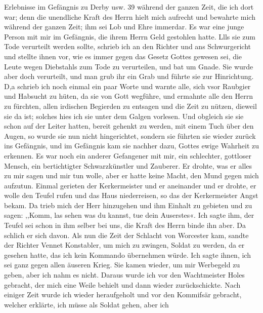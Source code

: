 Erlebnisse im Gefängnis zu Derby usw. 39
während der ganzen Zeit, die ich dort war; denn die unendliche
Kraft des Herrn hielt mich aufrecht und bewahrte mich während
der ganzen Zeit; ihm sei Lob und Ehre immerdar.
Es war eine junge Person mit mir im Gefängnis, die ihrem
Herrn Geld gestohlen hatte. Llls sie zum Tode verurteilt werden
sollte, schrieb ich an den Richter und ans Schwurgericht und
stellte ihnen vor, wie es immer gegen das Gesetz Gottes gewesen
sei, die Leute wegen Diebstahls zum Tode zu verurteilen, und
bat um Gnade. Sie wurde aber doch verurteilt, und man grub
ihr ein Grab und führte sie zur Hinrichtung. D,a schrieb ich noch
einmal ein paar Worte und warnte alle, sich vsor Raubgier und
Habsucht zu hüten, da sie von Gott wegführe, und ermahnte alle
den Herrn zu fürchten, allen irdischen Begierden zu entsagen und
die Zeit zu nützen, dieweil sie da ist; solches hies ich sie unter
dem Galgen vorlesen. Und obgleich sie sie schon auf der Leiter
hatten, bereit gehenkt zu werden, mit einem Tuch über den Augen,
so wurde sie nun nicht hingerichtet, sondern sie führten sie wieder
zurück ins Gefängnis, und im Gefängnis kam sie nachher dazu,
Gottes ewige Wahrheit zu erkennen.
Es war noch ein anderer Gefangener mit mir, ein schlechter,
gottloser Mensch, ein bertichtigter Schwarzkünstler und Zauberer.
Er drohte, was er alles zu mir sagen und mir tun wolle, aber
er hatte keine Macht, den Mund gegen mich aufzutun. Einmal
gerieten der Kerkermeister und er aneinander und er drohte, er
wolle den Teufel rufen und das Haus niederreisen, so das der
Kerkermeister Angst bekam. Da trieb mich der Herr hinzugehen
und ihm Einhalt zu gebieten und zu sagen: ,,Komm, las sehen
was du kannst, tue dein Auserstes«. Ich sagte ihm, der Teufel
sei schon in ihm selber bei uns, die Kraft des Herrn binde ihn
aber. Da schlich er sich davon.
Als nun die Zeit der Schlacht von Worcester kam, sandte
der Richter Vennet Konstabler, um mich zu zwingen, Soldat zu
werden, da er gesehen hatte, das ich kein Kommando übernehmen
würde. Ich sagte ihnen, ich sei ganz gegen allen äuseren Krieg.
Sie kamen wieder, um mir Werbegeld zu geben, aber ich nahm
es nicht. Daraus wurde ich vor den Wachtmeister Holes gebracht,
der mich eine Weile behielt und dann wieder zurückschickte. Nach
einiger Zeit wurde ich wieder heraufgeholt und vor den Kommifsär
gebracht, welcher erklärte, ich müsse als Soldat gehen, aber ich



